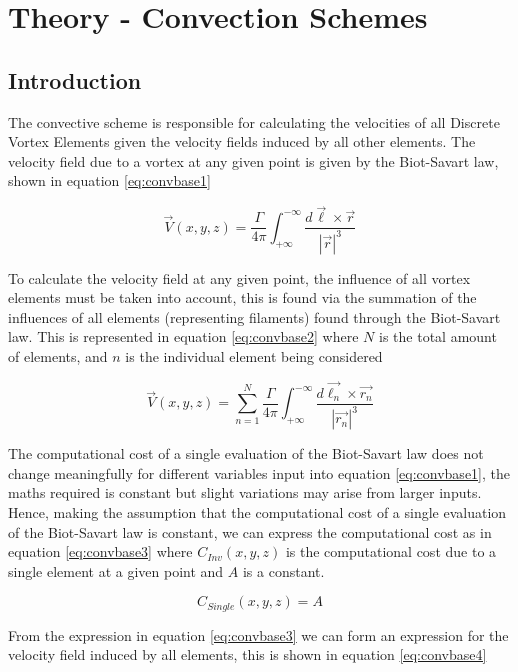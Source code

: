 
\section{Theory - Convection Schemes}
\subsection{Introduction}
The convective scheme is responsible for calculating the velocities of all Discrete Vortex Elements given the velocity fields induced by all other elements. The velocity field due to a vortex at any given point is given by the Biot-Savart law, shown in equation \ref{eq:convbase1}

\begin{equation}
\label{eq:convbase1}
\vec{V}(x,y,z)=\frac{\Gamma}{4\pi}\int_{+\infty}^{-\infty} \frac{d\vec{\ell}\times\vec{r}}{|\vec{r}|^3}
\end{equation}

To calculate the velocity field at any given point, the influence of all vortex elements must be taken into account, this is found via the summation of the influences of all elements (representing filaments) found through the Biot-Savart law. This is represented in equation \ref{eq:convbase2} where $N$ is the total amount of elements, and $n$ is the individual element being considered

\begin{equation}
\label{eq:convbase2}
\vec{V}(x,y,z)=\sum_{n=1}^{N} \frac{\Gamma}{4\pi}\int_{+\infty}^{-\infty} \frac{d\vec{\ell_n}\times\vec{r_n}}{|\vec{r_n}|^3}
\end{equation}

The computational cost of a single evaluation of the Biot-Savart law does not change meaningfully for different variables input into equation \ref{eq:convbase1}, the maths required is constant but slight variations may arise from larger inputs. Hence, making the assumption that the computational cost of a single evaluation of the Biot-Savart law is constant, we can express the computational cost as in equation \ref{eq:convbase3} where $C_{Inv}(x,y,z)$ is the computational cost due to a single element at a given point and $A$ is a constant.

\begin{equation}
\label{eq:convbase3}
C_{Single}(x,y,z)=A
\end{equation}

From the expression in equation \ref{eq:convbase3} we can form an expression for the velocity field induced by all elements, this is shown in equation \ref{eq:convbase4}

